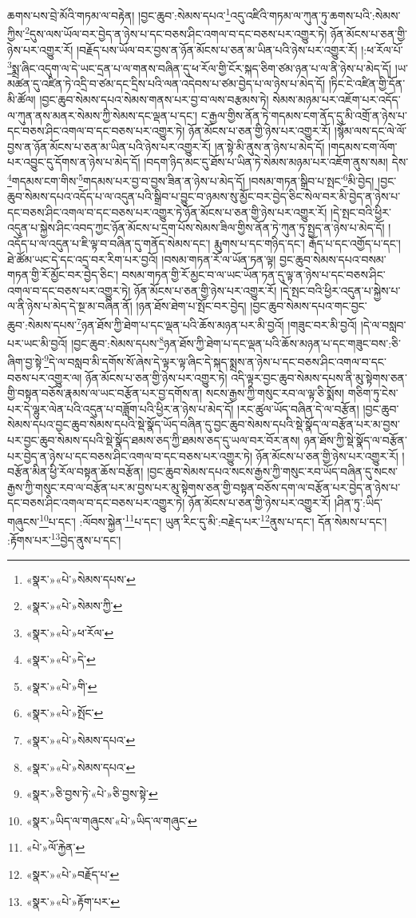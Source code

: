 ཆགས་པས་བྲེ་མོའི་གཏམ་ལ་བརྟེན། །བྱང་ཆུབ་:སེམས་དཔའ་\footnote{«སྣར་»«པེ་»སེམས་དཔས་}འདུ་འཛིའི་གཏམ་ལ་ཀུན་ཏུ་ཆགས་པའི་:སེམས་ཀྱིས་\footnote{«སྣར་»«པེ་»སེམས་ཀྱི་}དུས་ལས་ཡོལ་བར་བྱེད་ན་ཉེས་པ་དང་བཅས་ཤིང་འགལ་བ་དང་བཅས་པར་འགྱུར་ཏེ། ཉོན་མོངས་པ་ཅན་གྱི་ཉེས་པར་འགྱུར་རོ། །བརྗོད་པས་ཡོལ་བར་བྱས་ན་ཉོན་མོངས་པ་ཅན་མ་ཡིན་པའི་ཉེས་པར་འགྱུར་རོ། །:ཕ་རོལ་པོ་\footnote{«སྣར་»«པེ་»ཕ་རོལ་}སྨྲ་ཞིང་འདུག་ལ་དེ་ཡང་དྲན་པ་ལ་གནས་བཞིན་དུ་ཕ་རོལ་གྱི་ངོར་སྐད་ཅིག་ཙམ་ཉན་པ་ལ་ནི་ཉེས་པ་མེད་དོ། །ཡ་མཚན་དུ་འཛིན་ཏེ་འདྲི་བ་ཙམ་དང་དྲིས་པའི་ལན་འདེབས་པ་ཙམ་བྱེད་པ་ལ་ཉེས་པ་མེད་དོ། །ཏིང་ངེ་འཛིན་གྱི་དོན་མི་ཚོལ། །བྱང་ཆུབ་སེམས་དཔའ་སེམས་གནས་པར་བྱ་བ་ལས་བརྩམས་ཏེ། སེམས་མཉམ་པར་འཇོག་པར་འདོད་ལ་ཀུན་ནས་མནར་སེམས་ཀྱི་སེམས་དང་ལྡན་པ་དང་། ང་རྒྱལ་གྱིས་ནོན་ཏེ་གདམས་ངག་ནོད་དུ་མི་འགྲོ་ན་ཉེས་པ་དང་བཅས་ཤིང་འགལ་བ་དང་བཅས་པར་འགྱུར་ཏེ། ཉོན་མོངས་པ་ཅན་གྱི་ཉེས་པར་འགྱུར་རོ། །སྙོམ་ལས་དང་ལེ་ལོ་བྱས་ན་ཉོན་མོངས་པ་ཅན་མ་ཡིན་པའི་ཉེས་པར་འགྱུར་རོ། །ན་སྟེ་མི་ནུས་ན་ཉེས་པ་མེད་དོ། །གདམས་ངག་ལོག་པར་འབྱུང་དུ་དོགས་ན་ཉེས་པ་མེད་དོ། །བདག་ཉིད་མང་དུ་ཐོས་པ་ཡིན་ཏེ་སེམས་མཉམ་པར་འཇོག་ནུས་སམ། དེས་\footnote{«སྣར་»«པེ་»དེ་}གདམས་ངག་གིས་\footnote{«སྣར་»«པེ་»གི་}གདམས་པར་བྱ་བ་བྱས་ཟིན་ན་ཉེས་པ་མེད་དོ། །བསམ་གཏན་སྒྲིབ་པ་སྤང་\footnote{«སྣར་»«པེ་»སྤོང་}མི་བྱེད། །བྱང་ཆུབ་སེམས་དཔའ་འདོད་པ་ལ་འདུན་པའི་སྒྲིབ་པ་བྱུང་བ་ཉམས་སུ་མྱོང་བར་བྱེད་ཅིང་སེལ་བར་མི་བྱེད་ན་ཉེས་པ་དང་བཅས་ཤིང་འགལ་བ་དང་བཅས་པར་འགྱུར་ཏེ་ཉོན་མོངས་པ་ཅན་གྱི་ཉེས་པར་འགྱུར་རོ། །དེ་སྤང་བའི་ཕྱིར་འདུན་པ་སྐྱེས་ཤིང་འབད་ཀྱང་ཉོན་མོངས་པ་དྲག་པོས་སེམས་ཟིལ་གྱིས་ནོན་ཏེ་ཀུན་ཏུ་སྤྱད་ན་ཉེས་པ་མེད་དོ། །འདོད་པ་ལ་འདུན་པ་ཇི་ལྟ་བ་བཞིན་དུ་གནོད་སེམས་དང་། རྨུགས་པ་དང་གཉིད་དང་། རྒོད་པ་དང་འགྱོད་པ་དང་། ཐེ་ཚོམ་ཡང་དེ་དང་འདྲ་བར་རིག་པར་བྱའོ། །བསམ་གཏན་རོ་ལ་ཡོན་ཏན་ལྟ། བྱང་ཆུབ་སེམས་དཔའ་བསམ་གཏན་གྱི་རོ་མྱོང་བར་བྱེད་ཅིང་། བསམ་གཏན་གྱི་རོ་མྱང་བ་ལ་ཡང་ཡོན་ཏན་དུ་ལྟ་ན་ཉེས་པ་དང་བཅས་ཤིང་འགལ་བ་དང་བཅས་པར་འགྱུར་ཏེ། ཉོན་མོངས་པ་ཅན་གྱི་ཉེས་པར་འགྱུར་རོ། །དེ་སྤང་བའི་ཕྱིར་འདུན་པ་སྐྱེས་པ་ལ་ནི་ཉེས་པ་མེད་དེ་སྔ་མ་བཞིན་ནོ། །ཉན་ཐོས་ཐེག་པ་སྤོང་བར་བྱེད། །བྱང་ཆུབ་སེམས་དཔའ་གང་བྱང་ཆུབ་:སེམས་དཔས་\footnote{«སྣར་»«པེ་»སེམས་དཔའ་}ཉན་ཐོས་ཀྱི་ཐེག་པ་དང་ལྡན་པའི་ཆོས་མཉན་པར་མི་བྱའོ། །གཟུང་བར་མི་བྱའོ། །དེ་ལ་བསླབ་པར་ཡང་མི་བྱའོ། །བྱང་ཆུབ་:སེམས་དཔས་\footnote{«སྣར་»«པེ་»སེམས་དཔའ་}ཉན་ཐོས་ཀྱི་ཐེག་པ་དང་ལྡན་པའི་ཆོས་མཉན་པ་དང་གཟུང་བས་:ཅི་ཞིག་བྱ་སྟེ་\footnote{«སྣར་»ཅི་བྱས་ཏེ་«པེ་»ཅི་བྱས་སྟེ་}དེ་ལ་བསླབ་མི་དགོས་སོ་ཞེས་དེ་ལྟར་ལྟ་ཞིང་དེ་སྐད་སྨྲས་ན་ཉེས་པ་དང་བཅས་ཤིང་འགལ་བ་དང་བཅས་པར་འགྱུར་ལ། ཉོན་མོངས་པ་ཅན་གྱི་ཉེས་པར་འགྱུར་ཏེ། འདི་ལྟར་བྱང་ཆུབ་སེམས་དཔས་ནི་མུ་སྟེགས་ཅན་གྱི་བསྟན་བཅོས་རྣམས་ལ་ཡང་བརྩོན་པར་བྱ་དགོས་ན། སངས་རྒྱས་ཀྱི་གསུང་རབ་ལ་ལྟ་ཅི་སྨོས། གཅིག་ཏུ་ངེས་པར་དེ་ལྷུར་ལེན་པའི་འདུན་པ་བཟློག་པའི་ཕྱིར་ན་ཉེས་པ་མེད་དོ། །རང་ཚུལ་ཡོད་བཞིན་དེ་ལ་བརྩོན། །བྱང་ཆུབ་སེམས་དཔའ་བྱང་ཆུབ་སེམས་དཔའི་སྡེ་སྣོད་ཡོད་བཞིན་དུ་བྱང་ཆུབ་སེམས་དཔའི་སྡེ་སྣོད་ལ་བརྩོན་པར་མ་བྱས་པར་བྱང་ཆུབ་སེམས་དཔའི་སྡེ་སྣོད་ཐམས་ཅད་ཀྱི་ཐམས་ཅད་དུ་ཡལ་བར་བོར་ནས། ཉན་ཐོས་ཀྱི་སྡེ་སྣོད་ལ་བརྩོན་པར་བྱེད་ན་ཉེས་པ་དང་བཅས་ཤིང་འགལ་བ་དང་བཅས་པར་འགྱུར་ཏེ། ཉོན་མོངས་པ་ཅན་གྱི་ཉེས་པར་འགྱུར་རོ། །བརྩོན་མིན་ཕྱི་རོལ་བསྟན་ཆོས་བརྩོན། །བྱང་ཆུབ་སེམས་དཔའ་སངས་རྒྱས་ཀྱི་གསུང་རབ་ཡོད་བཞིན་དུ་སངས་རྒྱས་ཀྱི་གསུང་རབ་ལ་བརྩོན་པར་མ་བྱས་པར་མུ་སྟེགས་ཅན་གྱི་བསྟན་བཅོས་དག་ལ་བརྩོན་པར་བྱེད་ན་ཉེས་པ་དང་བཅས་ཤིང་འགལ་བ་དང་བཅས་པར་འགྱུར་ཏེ། ཉོན་མོངས་པ་ཅན་གྱི་ཉེས་པར་འགྱུར་རོ། །ཤིན་ཏུ་:ཡིད་གཞུངས་\footnote{«སྣར་»ཡིད་ལ་གཞུངས་«པེ་»ཡིད་ལ་གཞུང་}པ་དང་། :ལོབས་སྐྱེན་\footnote{«པེ་»ལོ་རྐྱེན་}པ་དང་། ཡུན་རིང་དུ་མི་:བརྗེད་པར་\footnote{«སྣར་»«པེ་»བརྗོད་པ་}ནུས་པ་དང་། དོན་སེམས་པ་དང་། :རྟོགས་པར་\footnote{«སྣར་»«པེ་»རྟོག་པར་}བྱེད་ནུས་པ་དང་། 
